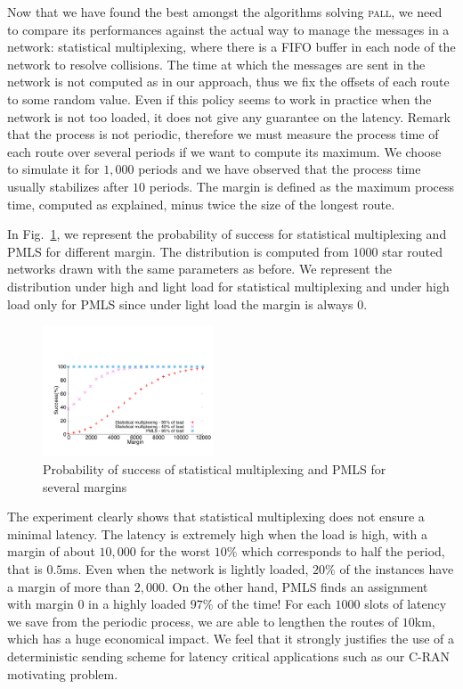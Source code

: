 \documentclass[10pt, conference, letterpaper]{IEEEtran}
\newcommand\pall{\textsc{pall}\xspace}
\begin{document}
     Now that we have found the best amongst the algorithms solving \pall, we need to compare its performances against the actual way to manage the messages in a network:  statistical multiplexing, where there is a FIFO buffer in each node of the network to resolve collisions. The time at which the messages are sent in the network is not computed as in our approach, thus we fix the offsets of each route to some random value.
     Even if this policy seems to work in practice when the network is not too loaded, it does not give any guarantee on the latency. Remark that the process is not periodic, therefore we must measure the process time of each route over several periods if we want to compute its maximum. We choose to simulate it for $1,000$ periods and we have observed that the process time usually stabilizes after $10$ periods. The margin is defined as the maximum process time, computed as explained, minus twice the size of the longest route. 
	    
     In Fig.~\ref{fig:sto}, we represent the probability of success for 
     statistical multiplexing and PMLS for different margin. The distribution is computed from $1000$ star routed networks drawn with the same parameters as before. We represent the distribution under high and light load for statistical multiplexing and under high load only for PMLS since under light load the margin is always $0$. 
     

    \begin{figure}
       \begin{center}
      \includegraphics[width = 0.45\textwidth]{stochastic.pdf}
      \end{center}
      \caption{Probability of success of statistical multiplexing and PMLS for several margins}
      \label{fig:sto}   
     \end{figure}    
     
     The experiment clearly shows that statistical multiplexing does not ensure a minimal latency. 
     The latency is extremely high when the load is high, with a margin of about $10,000$ for the worst $10\%$ which corresponds to half the period, that is $0.5$ms. Even when the network is lightly loaded, $20\%$ of the instances have a margin of more than $2,000$. On the other hand, PMLS finds an assignment with margin $0$ in a highly loaded $97\%$ of the time! 
     For each $1000$ slots of latency we save from the periodic process, we are able to lengthen the routes of $10$km, which has a huge economical impact.
     We feel that it strongly justifies the use of a deterministic sending scheme for latency critical applications such as our C-RAN motivating problem.     
     
\end{document}

